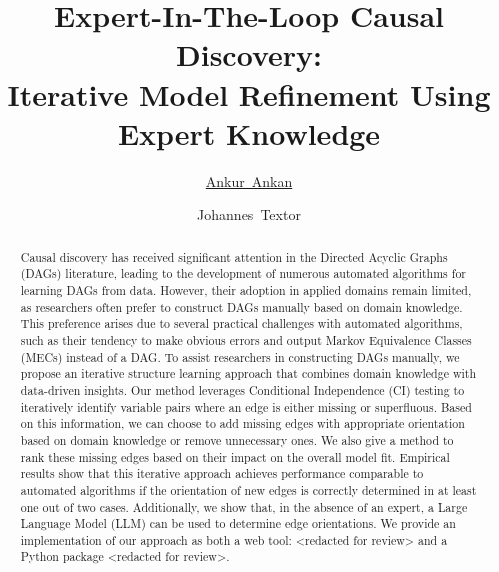 \documentclass{uai2025} %
\title{Expert-In-The-Loop Causal Discovery: \\ Iterative Model Refinement Using Expert Knowledge}
\author[1]{\href{mailto:<ankur.ankan@ru.nl>?Subject=Your UAI 2025 paper}{Ankur~Ankan}{}}
\author[1]{Johannes~Textor}
\affil[1]{%
    Institute for Computing and Information Sciences\\
    Radboud University\\
    Nijmegen, The Netherlands
}
\begin{document}
\maketitle

\begin{abstract}

	Causal discovery has received significant attention in the Directed
	Acyclic Graphs (DAGs) literature, leading to the development of
	numerous automated algorithms for learning DAGs from data. However,
	their adoption in applied domains remain limited, as researchers often
	prefer to construct DAGs manually based on domain knowledge. This
	preference arises due to several practical challenges with automated
	algorithms, such as their tendency to make obvious errors and output
	Markov Equivalence Classes (MECs) instead of a DAG. To assist
	researchers in constructing DAGs manually, we propose an iterative
	structure learning approach that combines domain knowledge with
	data-driven insights. Our method leverages Conditional Independence
	(CI) testing to iteratively identify variable pairs where an edge is
	either missing or superfluous. Based on this information, we can choose
	to add missing edges with appropriate orientation based on domain
	knowledge or remove unnecessary ones. We also give a method to rank
	these missing edges based on their impact on the overall model fit.
	Empirical results show that this iterative approach achieves
	performance comparable to automated algorithms if the orientation of
	new edges is correctly determined in at least one out of two cases.
	Additionally, we show that, in the absence of an expert, a Large
	Language Model (LLM) can be used to determine edge orientations. We
	provide an implementation of our approach as both a web tool: <redacted
	for review> and a Python package <redacted for review>.

\end{abstract}
\end{document}
